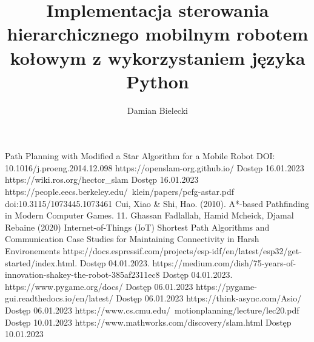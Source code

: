 \documentclass[12pt,twoside]{article}
\author{Damian Bielecki}
\title{Implementacja sterowania hierarchicznego mobilnym robotem kołowym z wykorzystaniem języka Python}
\begin{document}
\maketitle

\blankpage

\tableofcontents
\clearpage
\blankpage










	




\clearpage
	
	
\begin{thebibliography}{4}
	 Path Planning with Modified a Star Algorithm for a Mobile Robot DOI: 10.1016/j.proeng.2014.12.098
	 https://openslam-org.github.io/ Dostęp 16.01.2023
	 https://wiki.ros.org/hector\_slam Dostęp 16.01.2023
	https://people.eecs.berkeley.edu/~klein/papers/pcfg-astar.pdf  doi:10.3115/1073445.1073461
	 Cui, Xiao \& Shi, Hao. (2010). A*-based Pathfinding in Modern Computer Games. 11. 
	 Ghassan Fadlallah, Hamid Mcheick, Djamal Rebaine (2020) Internet-of-Things (IoT) Shortest Path Algorithms and Communication Case Studies for Maintaining Connectivity in Harsh Environements 
	 https://docs.espressif.com/projects/esp-idf/en/latest/esp32/get-started/index.html. Dostęp 04.01.2023.
	 https://medium.com/dish/75-years-of-innovation-shakey-the-robot-385af2311ec8 Dostęp 04.01.2023.
	 https://www.pygame.org/docs/ Dostęp 06.01.2023
	 https://pygame-gui.readthedocs.io/en/latest/ Dostęp 06.01.2023
	 https://think-async.com/Asio/ Dostęp 06.01.2023
	 https://www.cs.cmu.edu/~motionplanning/lecture/lec20.pdf Dostęp 10.01.2023
	 https://www.mathworks.com/discovery/slam.html Dostęp 10.01.2023
\end{thebibliography}
	
\clearpage
	
\end{document}
